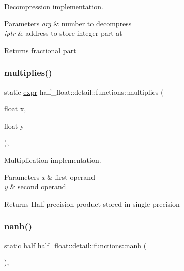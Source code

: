 Decompression implementation. 
\begin{DoxyParams}{Parameters}
{\em arg} & number to decompress \\
\hline
{\em iptr} & address to store integer part at \\
\hline
\end{DoxyParams}
\begin{DoxyReturn}{Returns}
fractional part 
\end{DoxyReturn}
\mbox{\label{structhalf__float_1_1detail_1_1functions_a3d2a59f7891825142a62f7663bdefd73}} 
\subsubsection{\texorpdfstring{multiplies()}{multiplies()}}
{\footnotesize\ttfamily static \hyperlink{structhalf__float_1_1detail_1_1expr}{expr} half\+\_\+float\+::detail\+::functions\+::multiplies (\begin{DoxyParamCaption}\item[{float}]{x,  }\item[{float}]{y }\end{DoxyParamCaption})\hspace{0.3cm}{\ttfamily [inline]}, {\ttfamily [static]}}

Multiplication implementation. 
\begin{DoxyParams}{Parameters}
{\em x} & first operand \\
\hline
{\em y} & second operand \\
\hline
\end{DoxyParams}
\begin{DoxyReturn}{Returns}
Half-\/precision product stored in single-\/precision 
\end{DoxyReturn}
\mbox{\label{structhalf__float_1_1detail_1_1functions_a1195cacfc5295c6baa4763ca0bb4ccc0}} 
\subsubsection{\texorpdfstring{nanh()}{nanh()}}
{\footnotesize\ttfamily static \hyperlink{classhalf__float_1_1half}{half} half\+\_\+float\+::detail\+::functions\+::nanh (\begin{DoxyParamCaption}{ }\end{DoxyParamCaption})\hspace{0.3cm}{\ttfamily [inline]}, {\ttfamily [static]}}

